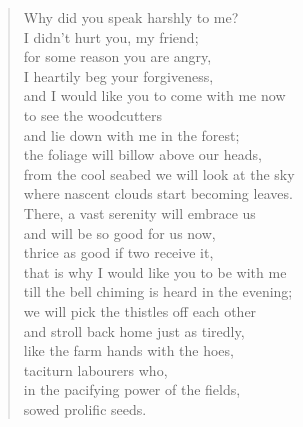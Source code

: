 \documentclass[11pt]{book}
\newcommand*{\centeredornament}{\centerline{\pgfornament[width=6cm]{88}}}
\begin{document}
\newpage

\vspace*{-15mm}
\centeredornament



\begin{verse}
  Why did you speak harshly to me? \\
  I didn't hurt you, my friend; \\
  for some reason you are angry, \\
  I heartily beg your forgiveness, \\
  and I would like you to come with me now \\
  to see the woodcutters \\
  and lie down with me in the forest; \\
  the foliage will billow above our heads, \\
  from the cool seabed we will look at the sky \\
  where nascent clouds start becoming leaves. \\
  There, a vast serenity will embrace us \\
  and will be so good for us now, \\
  thrice as good if two receive it, \\
  that is why I would like you to be with me \\
  till the bell chiming is heard in the evening; \\
  we will pick the thistles off each other \\
  and stroll back home just as tiredly, \\
  like the farm hands with the hoes, \\
  taciturn labourers who, \\
  in the pacifying power of the fields, \\
  sowed prolific seeds.
\end{verse}

\newpage

\vspace*{-15mm}
\centeredornament


\end{document}
